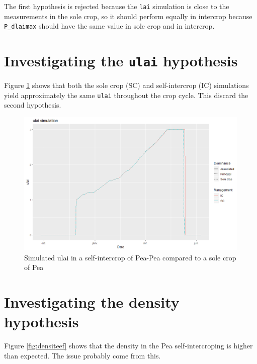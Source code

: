 \documentclass[]{book}
\begin{document}
The first hypothesis is rejected because the \texttt{lai} simulation is close to the measurements in the sole crop, so it should perform equally in intercrop because \texttt{P\_dlaimax} should have the same value in sole crop and in intercrop.

\hypertarget{investigating-the-ulai-hypothesis}{%
\section{\texorpdfstring{Investigating the \texttt{ulai} hypothesis}{Investigating the ulai hypothesis}}\label{investigating-the-ulai-hypothesis}}

Figure \ref{fig:ulai} shows that both the sole crop (SC) and self-intercrop (IC) simulations yield approximately the same \texttt{ulai} throughout the crop cycle. This discard the second hypothesis.

\begin{figure}
\centering
\includegraphics{img/ulai_laitoohigh.png}
\caption{\label{fig:ulai}Simulated ulai in a self-intercrop of Pea-Pea compared to a sole crop of Pea}
\end{figure}

\hypertarget{investigating-the-density-hypothesis}{%
\section{Investigating the density hypothesis}\label{investigating-the-density-hypothesis}}

Figure \ref{fig:densiteef} shows that the density in the Pea self-intercroping is higher than expected. The issue probably come from this.
\end{document}
